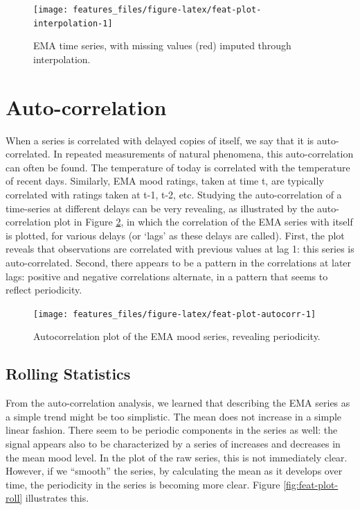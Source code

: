 \documentclass[]{book}
\begin{document}
\begin{figure}

{\centering \texttt{[image: features\_files/figure-latex/feat-plot-interpolation-1]} 

}

\caption{EMA time series, with missing values (red) imputed through interpolation.}\label{fig:feat-plot-interpolation}
\end{figure}

\section{Auto-correlation}\label{auto-correlation}


When a series is correlated with delayed copies of itself, we say that
it is auto-correlated. In repeated measurements of natural phenomena,
this auto-correlation can often be found. The temperature of today is
correlated with the temperature of recent days. Similarly, EMA mood
ratings, taken at time t, are typically correlated with ratings taken at
t-1, t-2, etc. Studying the auto-correlation of a time-series at
different delays can be very revealing, as illustrated by the
auto-correlation plot in Figure \ref{fig:feat-plot-autocorr}, in which
the correlation of the EMA series with itself is plotted, for various
delays (or `lags' as these delays are called). First, the plot reveals
that observations are correlated with previous values at lag 1: this
series is auto-correlated. Second, there appears to be a pattern in the
correlations at later lags: positive and negative correlations
alternate, in a pattern that seems to reflect periodicity.

\begin{figure}

{\centering \texttt{[image: features\_files/figure-latex/feat-plot-autocorr-1]} 

}

\caption{Autocorrelation plot of the EMA mood series, revealing periodicity.}\label{fig:feat-plot-autocorr}
\end{figure}

\subsection{Rolling Statistics}\label{rolling-statistics}

From the auto-correlation analysis, we learned that describing the EMA
series as a simple trend might be too simplistic. The mean does not
increase in a simple linear fashion. There seem to be periodic
components in the series as well: the signal appears also to be
characterized by a series of increases and decreases in the mean mood
level. In the plot of the raw series, this is not immediately clear.
However, if we ``smooth'' the series, by calculating the mean as it
develops over time, the periodicity in the series is becoming more
clear. Figure \ref{fig:feat-plot-roll} illustrates this.
\end{document}
